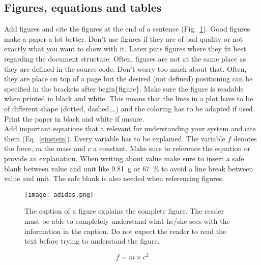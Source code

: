 \subsection{Figures, equations and tables}
Add figures and cite the figures at the end of a sentence (Fig.~\ref{adidas}). Good figures make a paper a lot better. Don't use figures if they are of bad quality or not exactly what you want to show with it. Latex puts figures where they fit best regarding the document structure. Often, figures are not at the same place as they are defined in the source code. Don't worry too much about that. Often, they are place on top of a page but the desired (not defined) positioning can be specified in the brackets after begin\{figure\}. Make sure the figure is readable when printed in black and white. This means that the lines in a plot have to be of different shape (dotted, dashed,\dots) and the coloring has to be adapted if used. Print the paper in black and white if unsure.\\
Add important equations that a relevant for understanding your system and cite them (Eq.~\ref{einstein}). Every variable has to be explained. The variable $f$ denotes the force, $m$ the mass and $c$ a constant. Make sure to reference the equation or provide an explanation. When writing about value make sure to insert a safe blank between value and unit like 9.81~g or 67~\% to avoid a line break between value and unit. The safe blank is also needed when referencing figures.

\begin{figure}[t!]
\centering
\texttt{[image: adidas.png]}
\caption{The caption of a figure explains the complete figure. The reader must be able to completely understand what he/she sees with the information in the caption. Do not expect the reader to read the text before trying to understand the figure.}
\label{adidas}
\end{figure}

\begin{equation}
f = m \times c^2
\label{einstein}
\end{equation}

